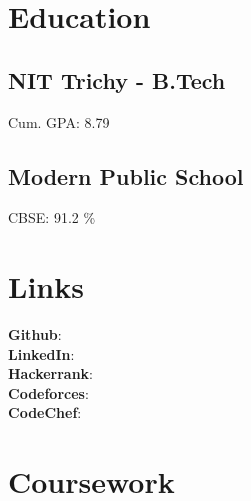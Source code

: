 \documentclass[]{deedy-resume-openfont}
\begin{document}
\lastupdated


\begin{minipage}[t]{0.30\textwidth}

\section{Education}

\subsection{NIT Trichy - B.Tech}
Cum. GPA: 8.79 \\
\sectionsep

\subsection{Modern Public School}
CBSE: 91.2 \% \\


\section{Links}
\textbf{Github}: \href{https://github.com/adityaa30}{} \\
\textbf{LinkedIn}: \href{https://www.linkedin.com/in/adityaa30/}{} \\
\textbf{Hackerrank}: \href{https://www.hackerrank.com/adityaa30?hr_r=1}{} \\
\textbf{Codeforces}: \href{https://codeforces.com/profile/adityaa30}{} \\
\textbf{CodeChef}: \href{https://www.codechef.com/users/adityaa30}{}

\section{Coursework}


\end{minipage}
\end{document}
